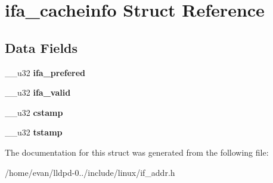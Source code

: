 \section{ifa\-\_\-cacheinfo \-Struct \-Reference}
\label{structifa__cacheinfo}
\subsection*{\-Data \-Fields}
\begin{DoxyCompactItemize}
\item 
\-\_\-\-\_\-u32 {\bfseries ifa\-\_\-prefered}\label{structifa__cacheinfo_a96a974787e5fa1ed44511f22088c1cd3}

\item 
\-\_\-\-\_\-u32 {\bfseries ifa\-\_\-valid}\label{structifa__cacheinfo_a10aafd1ddf8c58f82b57dbc67573cc05}

\item 
\-\_\-\-\_\-u32 {\bfseries cstamp}\label{structifa__cacheinfo_a419737e7e6be1a9bde4c2de55d4e0189}

\item 
\-\_\-\-\_\-u32 {\bfseries tstamp}\label{structifa__cacheinfo_a34a619193464150c4c4c026ccbd4b359}

\end{DoxyCompactItemize}


\-The documentation for this struct was generated from the following file\-:\begin{DoxyCompactItemize}
\item 
/home/evan/lldpd-\/0../include/linux/if\-\_\-addr.\-h\end{DoxyCompactItemize}
